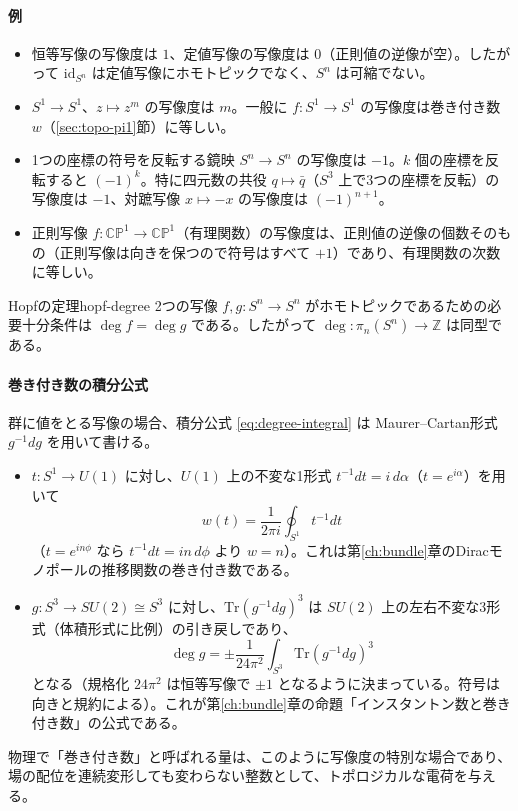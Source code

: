 \documentclass[uplatex, dvipdfmx, book]{jsbook}
\begin{document}
\paragraph{例}
\begin{itemize}
    \item 恒等写像の写像度は $1$、定値写像の写像度は $0$（正則値の逆像が空）。したがって $\mathrm{id}_{S^n}$ は定値写像にホモトピックでなく、$S^n$ は可縮でない。
    \item $S^1 \to S^1$、$z \mapsto z^m$ の写像度は $m$。一般に $f: S^1 \to S^1$ の写像度は巻き付き数 $w$（\ref{sec:topo-pi1}節）に等しい。
    \item 1つの座標の符号を反転する鏡映 $S^n \to S^n$ の写像度は $-1$。$k$ 個の座標を反転すると $(-1)^k$。特に四元数の共役 $q \mapsto \bar{q}$（$S^3$ 上で3つの座標を反転）の写像度は $-1$、対蹠写像 $x \mapsto -x$ の写像度は $(-1)^{n+1}$。
    \item 正則写像 $f: \mathbb{CP}^1 \to \mathbb{CP}^1$（有理関数）の写像度は、正則値の逆像の個数そのもの（正則写像は向きを保つので符号はすべて $+1$）であり、有理関数の次数に等しい。
\end{itemize}

\begin{mythm}{Hopfの定理}{hopf-degree}
2つの写像 $f, g: S^n \to S^n$ がホモトピックであるための必要十分条件は $\deg f = \deg g$ である。したがって $\deg: \pi_n(S^n) \to \mathbb{Z}$ は同型である。
\end{mythm}

\paragraph{巻き付き数の積分公式}
群に値をとる写像の場合、積分公式 \eqref{eq:degree-integral} は Maurer--Cartan形式 $g^{-1}dg$ を用いて書ける。
\begin{itemize}
    \item $t: S^1 \to U(1)$ に対し、$U(1)$ 上の不変な1形式 $t^{-1}dt = i\,d\alpha$（$t = e^{i\alpha}$）を用いて
    \begin{equation}
        w(t) = \frac{1}{2\pi i}\oint_{S^1} t^{-1}dt
    \end{equation}
    （$t = e^{in\phi}$ なら $t^{-1}dt = in\,d\phi$ より $w = n$）。これは第\ref{ch:bundle}章のDiracモノポールの推移関数の巻き付き数である。
    \item $g: S^3 \to SU(2) \cong S^3$ に対し、$\mathrm{Tr}(g^{-1}dg)^3$ は $SU(2)$ 上の左右不変な3形式（体積形式に比例）の引き戻しであり、
    \begin{equation}
        \deg g = \pm \frac{1}{24\pi^2}\int_{S^3} \mathrm{Tr}\left( g^{-1}dg \right)^3
    \end{equation}
    となる（規格化 $24\pi^2$ は恒等写像で $\pm 1$ となるように決まっている。符号は向きと規約による）。これが第\ref{ch:bundle}章の命題「インスタントン数と巻き付き数」の公式である。
\end{itemize}
物理で「巻き付き数」と呼ばれる量は、このように写像度の特別な場合であり、場の配位を連続変形しても変わらない整数として、トポロジカルな電荷を与える。
\end{document}
